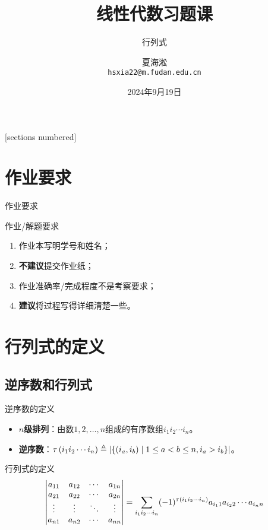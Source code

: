 \documentclass[9pt,xcolor=svgnames]{beamer} %
\title{线性代数习题课}
\author[夏海淞]{夏海淞\\ \texttt{hsxia22@m.fudan.edu.cn}}
\subtitle{行列式}
\institute[复旦大学]{计算机科学技术学院\\ 复旦大学}
\date{2024年9月19日}
\begin{document}
{
\maketitle
}%


\begin{frame}
    [sections numbered] %
    \tableofcontents[hideallsubsections] %
\end{frame}

\section{作业要求}
\begin{frame}{作业要求}
    \begin{block}{作业/解题要求}
        \begin{enumerate}
            \item 作业本写明学号和姓名；
            \item \textbf{不建议}提交作业纸；
            \item 作业准确率/完成程度不是考察要求；
            \item \textbf{建议}将过程写得详细清楚一些。
        \end{enumerate}
    \end{block}
\end{frame}

\section{行列式的定义}

\subsection*{逆序数和行列式}
\begin{frame}
    \begin{block}{逆序数的定义}
        \begin{itemize}
            \item \textbf{\(n\)级排列}：由数\(1,2,\dots,n\)组成的有序数组\(i_1i_2\cdots i_n\)。
            \item \textbf{逆序数}：\(\tau\spar{i_1i_2\cdots i_n}\triangleq\abs{\setof{\spar{i_a,i_b}\mid 1\leq a<b\leq n,i_a>i_b}}\)。
        \end{itemize}
    \end{block}
    \begin{block}{行列式的定义}
        \begin{equation*}
            \sqmat{vmatrix}{a}{n}=\sum_{i_1i_2\cdots i_n}(-1)^{\tau\spar{i_1i_2\cdots i_n}}a_{i_11}a_{i_22}\cdots a_{i_nn}
        \end{equation*}
    \end{block}
\end{frame}
\end{document}
